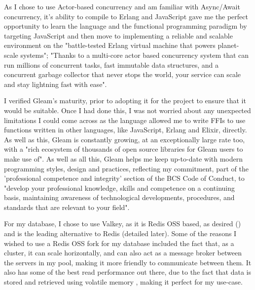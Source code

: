 \documentclass[]{final}
\begin{document}
As I chose to use Actor-based concurrency and am familiar with
Async/Await concurrency, it's ability to compile to Erlang and
JavaScript gave me the perfect opportunity to learn the language and
the functional programming paradigm by targeting JavaScript and then
move to implementing a reliable and scalable environment on the
"battle-tested Erlang virtual machine that powers planet-scale systems";
"Thanks to a multi-core actor based concurrency system that can run millions
of concurrent tasks, fast immutable data structures, and a concurrent garbage
collector that never stops the world, your service can scale and stay lightning
fast with ease".


I verified Gleam's maturity, prior to adopting it for the project to ensure
that it would be suitable. Once I had done this, I was not worried about
any unexpected limitations I could come across as the language allowed
me to write FFIs to use functions written in other languages, like JavaScript,
Erlang and Elixir, directly. As well as this, Gleam is constantly growing,
at an exceptionally large rate too, with a "rich ecosystem of thousands of
open source libraries for Gleam users to make use of".
As well as all this, Gleam helps me keep up-to-date with modern
programming styles, design and practices, reflecting my commitment,
part of the 'professional competence and integrity' section of the
BCS Code of Conduct, to
"develop your professional knowledge, skills and competence on a continuing
basis, maintaining awareness of technological developments, procedures, and
standards that are relevant to your field".

For my database, I chose to use Valkey, as it is Redis OSS based, as
desired {\hypersetup{linkcolor=teal}(\pageref{REDISOSS})} and is
the leading alternative to Redis (detailed later).
Some of the reasons I wished to use a Redis OSS fork for my database included
the fact that,
as a cluster, it can scale horizontally, and can also act as a message
broker between the servers in my pool, making it more friendly to communicate
between them. It also has some of the best read
performance out there, due to the fact that data is stored and retrieved
using volatile memory \cite{department_of_information_systems_university_of_nizwa_sultanate_of_oman_study_2022},
making it perfect for my use-case.
\end{document}
